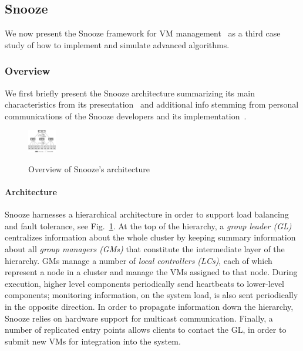 \subsection{Snooze}
\label{subsec:snooze}


We now present the Snooze framework for VM
management~\cite{feller:ccgrid12} as a third case study of how
to implement and simulate advanced algorithms.

\subsubsection{Overview}

We first briefly present the Snooze architecture summarizing its main
characteristics from its presentation~\cite{feller:ccgrid12} and
additional info stemming from personal communications of the Snooze
developers and its implementation~\cite{snoozedev14,snoozeweb}.

\begin{figure}
  {\centering \includegraphics[height=10mm]{figures/snoozearch.pdf}}
  \caption{Overview of Snooze's architecture}
  \label{fig:snoozearch}
\end{figure}

\paragraph{Architecture}

Snooze harnesses a hierarchical architecture in order to support load
balancing and fault tolerance, see Fig.~\ref{fig:snoozearch}. At the
top of the hierarchy, a \emph{group leader (GL)} centralizes
information about the whole cluster by keeping summary information
about all \emph{group managers (GMs)} that constitute the intermediate
layer of the hierarchy. GMs manage a number of \emph{local controllers
  (LCs)}, each of which represent a node in a cluster and manage the
VMs assigned to that node. During execution, higher level components
periodically send heartbeats to lower-level components; monitoring
information, \eg on the system load, is also sent periodically in the
opposite direction. In order to propagate information down the
hierarchy, Snooze relies on hardware support for multicast
communication. Finally, a number of replicated entry points allows
clients to contact the GL, \eg in order to submit new VMs for
integration into the system.

